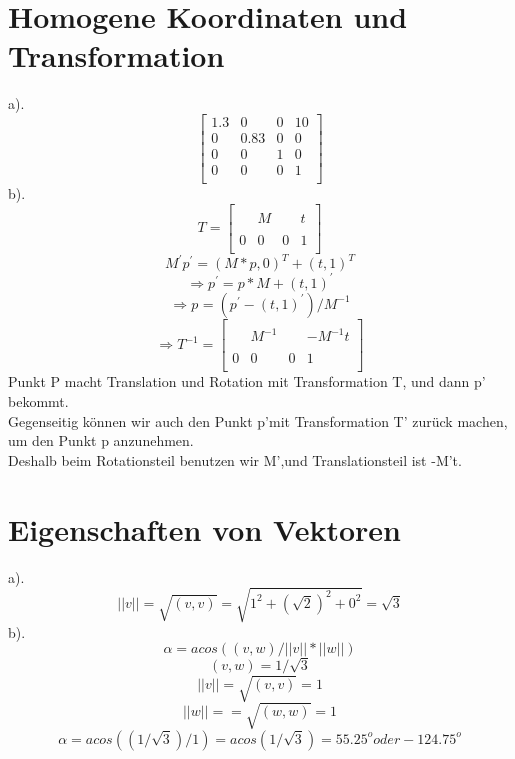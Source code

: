 \documentclass{article}
\begin{document}
\section{Homogene Koordinaten und Transformation}
a).
\[
\left[ \begin{array}{cccc}
     1.3 &  0      & 0  & 10\\
     0   &  0.83   & 0  & 0 \\
     0   &  0      & 1  & 0 \\
     0   &  0      & 0  & 1 \\
\end{array}
\right]
\]
b).
\[
T= \left[ \begin{array}{cccc}
         &         &    &   \\
         &  M      &    & t \\
         &         &    &   \\
     0   &  0      & 0  & 1 \\
\end{array}
\right]
\]
\[
M^{'}p^{'}=(M*p , 0)^{T}+(t,1)^{T}
\]
\[
\Rightarrow p^{'}=p*M+(t,1)^{'}
\]
\[
\Rightarrow p^{}=(p^{'}-(t,1)^{'})/M^{-1}
\]
\[
\Rightarrow
T^{-1}=\left[ \begin{array}{cccc}
         &         &    &   \\
         &  M^{-1}      &    & -M^{-1}t \\
         &         &    &   \\
     0   &  0      & 0  & 1 \\
\end{array}
\right]
\]
Punkt P macht Translation und Rotation mit Transformation T, und dann p' bekommt.
\\
Gegenseitig können wir auch den Punkt p'mit Transformation T' zurück machen, um den Punkt p anzunehmen.
\\
Deshalb beim Rotationsteil benutzen wir M',und Translationsteil ist -M't.

\newpage
\section{Eigenschaften von Vektoren}

a).
\[
||v|| = \sqrt{(v,v)} = \sqrt{1^{2} + (\sqrt{2})^{2} + 0^{2}} = \sqrt{3}
\]
b).
\[
\alpha=acos((v,w)/||v||*||w||)
\]
\[
(v,w)=1/\sqrt{3}
\]
\[
||v||= \sqrt{(v,v)}=1
\]
\[
||w||= = \sqrt{(w,w)}=1
\]
\[
\alpha=acos((1/\sqrt{3})/1)=acos(1/\sqrt{3})=55.25^{o} oder -124.75^{o}
\]
\end{document}
